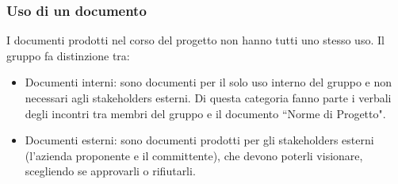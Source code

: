 \subsubsection{Uso di un documento}
I documenti prodotti nel corso del progetto non hanno tutti uno stesso uso. Il gruppo fa distinzione tra:
\begin{itemize}
    \item Documenti interni: sono documenti per il solo uso interno del gruppo e non necessari agli stakeholders esterni. Di questa categoria fanno parte i verbali degli incontri tra membri del gruppo e il documento ``Norme di Progetto".
    \item Documenti esterni: sono documenti prodotti per gli stakeholders esterni (l'azienda proponente e il committente), che devono poterli visionare, scegliendo se approvarli o rifiutarli.
\end{itemize}
